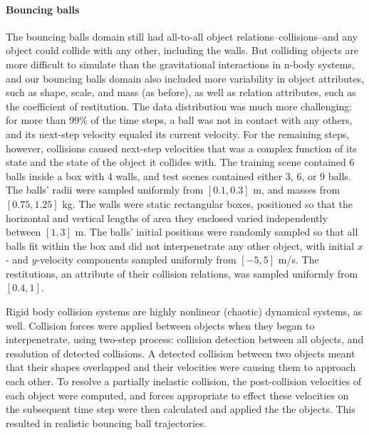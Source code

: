 \paragraph{Bouncing balls}
The bouncing balls domain still had all-to-all object
relations--collisions--and any object could collide with any other,
including the walls. But colliding objects are more difficult to
simulate than the gravitational interactions in n-body systems, and
our bouncing balls domain also included more variability in object
attributes, such as shape, scale, and mass (as before), as well as
relation attributes, such as the coefficient of restitution. The data
distribution was much more challenging: for more than 99\% of the time
steps, a ball was not in contact with any others, and its next-step
velocity equaled its current velocity. For the remaining steps,
however, collisions caused next-step velocities that was a complex
function of its state and the state of the object it collides
with. The training scene contained 6 balls inside a box with 4 walls,
and test scenes contained either 3, 6, or 9 balls. The balls' radii
were sampled uniformly from $[0.1,0.3]$ m, and masses from
$[0.75,1.25]$ kg. The walls were static rectangular boxes, positioned
so that the horizontal and vertical lengths of area they enclosed
varied independently between $[1,3]$ m. The balls' initial positions
were randomly sampled so that all balls fit within the box and did not
interpenetrate any other object, with initial $x$- and $y$-velocity
components sampled uniformly from $[-5,5]$ m/s. The restitutions, an
attribute of their collision relations, was sampled uniformly from
$[0.4,1]$.

Rigid body collision systems are highly nonlinear (chaotic) dynamical
systems, as well. Collision forces were applied between objects when
they began to interpenetrate, using two-step process: collision
detection between all objects, and resolution of detected
collisions. A detected collision between two objects meant that their
shapes overlapped and their velocities were causing them to approach
each other. To resolve a partially inelastic collision, the
post-collision velocities of each object were computed, and forces
appropriate to effect these velocities on the subsequent time step
were then calculated and applied the the objects. This resulted in
realistic bouncing ball trajectories.

